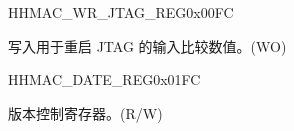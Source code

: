 \begin{register}{H}{HMAC\_WR\_JTAG\_REG}{0x00FC}\label{regdesc:HMACWRJTAGREG}
%
\regnewline%
\begin{regdesc}\begin{reglist}
\label{fielddesc:HMACWRJTAG}\item [HMAC\_WR\_JTAG] 写入用于重启 JTAG 的输入比较数值。(WO)
\end{reglist}\end{regdesc}
\end{register}



\begin{register}{H}{HMAC\_DATE\_REG}{0x01FC}\label{regdesc:HMACDATEREG}
%
%
\regnewline%
\begin{regdesc}\begin{reglist}
\label{fielddesc:HMACDATE}\item [HMAC\_DATE] 版本控制寄存器。(R/W)
\end{reglist}\end{regdesc}
\end{register}




